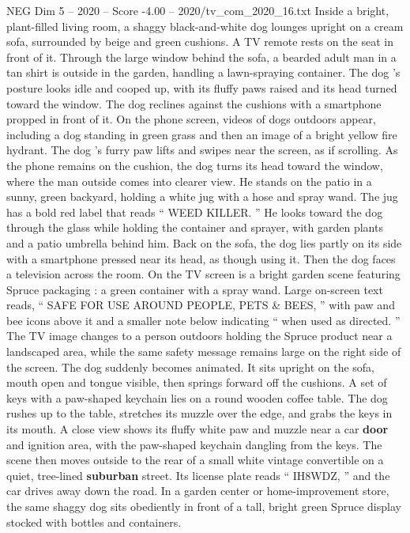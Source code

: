 \begin{textsample}{NEG Dim 5 – 2020 – Score -4.00 – 2020/tv\_com\_2020\_16.txt}  \label{ex:f5_neg_036}
Inside a bright, plant-filled living room, a shaggy black-and-white dog lounges upright on a cream sofa, surrounded by beige and green cushions.
A TV remote rests on the seat in front of it.
Through the large window behind the sofa, a bearded adult man in a tan shirt is outside in the garden, handling a lawn-spraying container.
The dog ’s posture looks idle and cooped up, with its fluffy paws raised and its head turned toward the window.
The dog reclines against the cushions with a smartphone propped in front of it.
On the phone screen, videos of dogs outdoors appear, including a dog standing in green grass and then an image of a bright yellow fire hydrant.
The dog ’s furry paw lifts and swipes near the screen, as if scrolling.
As the phone remains on the cushion, the dog turns its head toward the window, where the man outside comes into clearer view.
He stands on the patio in a sunny, green backyard, holding a white jug with a hose and spray wand.
The jug has a bold red label that reads “ WEED KILLER. ” He looks toward the dog through the glass while holding the container and sprayer, with garden plants and a patio umbrella behind him.
Back on the sofa, the dog lies partly on its side with a smartphone pressed near its head, as though using it.
Then the dog faces a television across the room.
On the TV screen is a bright garden scene featuring Spruce packaging : a green container with a spray wand.
Large on-screen text reads, “ SAFE FOR USE AROUND PEOPLE, PETS \& BEES, ” with paw and bee icons above it and a smaller note below indicating “ when used as directed. ” The TV image changes to a person outdoors holding the Spruce product near a landscaped area, while the same safety message remains large on the right side of the screen.
The dog suddenly becomes animated.
It sits upright on the sofa, mouth open and tongue visible, then springs forward off the cushions.
A set of keys with a paw-shaped keychain lies on a round wooden coffee table.
The dog rushes up to the table, stretches its muzzle over the edge, and grabs the keys in its mouth.
A close view shows its fluffy white paw and muzzle near a car \textbf{door} and ignition area, with the paw-shaped keychain dangling from the keys.
The scene then moves outside to the rear of a small white vintage convertible on a quiet, tree-lined \textbf{suburban} street.
Its license plate reads “ IH8WDZ, ” and the car drives away down the road.
In a garden center or home-improvement store, the same shaggy dog sits obediently in front of a tall, bright green Spruce display stocked with bottles and containers.

\end{textsample}

